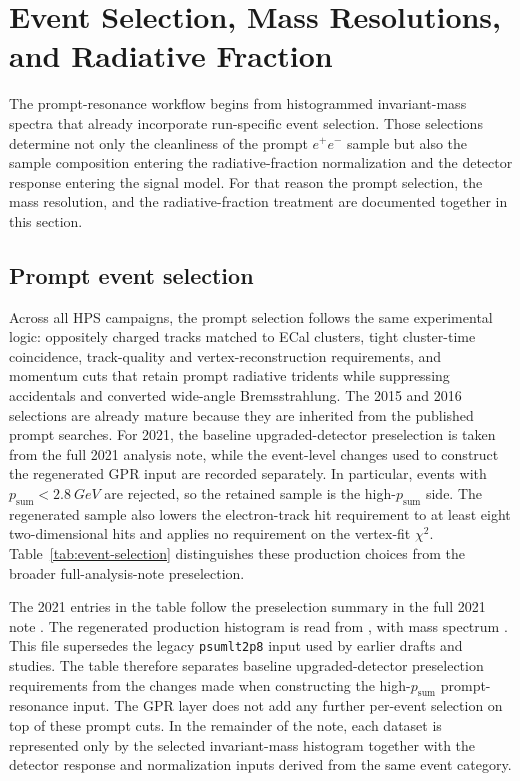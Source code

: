 \section{Event Selection, Mass Resolutions, and Radiative Fraction}
\label{sec:event-selection}

The prompt-resonance workflow begins from histogrammed invariant-mass spectra that
already incorporate run-specific event selection. Those selections determine not only
the cleanliness of the prompt $e^+e^-$ sample but also the sample composition entering
the radiative-fraction normalization and the detector response entering the signal
model. For that reason the prompt selection, the mass resolution, and the
radiative-fraction treatment are documented together in this section.

\subsection{Prompt event selection}

Across all HPS campaigns, the prompt selection follows the same experimental logic:
oppositely charged tracks matched to ECal clusters, tight cluster-time coincidence,
track-quality and vertex-reconstruction requirements, and momentum cuts that retain
prompt radiative tridents while suppressing accidentals and converted wide-angle
Bremsstrahlung. The
2015 and 2016 selections are already mature because they are inherited from the
published prompt searches. For 2021, the baseline upgraded-detector preselection is
taken from the full 2021 analysis note, while the event-level changes used to construct
the regenerated GPR input are recorded separately. In particular, events with
$p_{\mathrm{sum}}<\SI{2.8}{GeV}$ are rejected, so the retained sample is the
high-$p_{\mathrm{sum}}$ side. The regenerated sample also lowers the electron-track hit
requirement to at least eight two-dimensional hits and applies no requirement on the
vertex-fit $\chi^2$. Table~\ref{tab:event-selection} distinguishes these production
choices from the broader full-analysis-note preselection.





The 2021 entries in the table follow the preselection summary in the full 2021 note
\cite[Sec.~4.8, Table~38 and App.~A]{HPS2021FullAnalysisNote}. The regenerated production
histogram is read from , with mass spectrum
. This file supersedes the legacy \texttt{psumlt2p8}
input used by earlier drafts and studies. The table therefore separates baseline
upgraded-detector preselection requirements from the changes made when constructing the
high-$p_{\mathrm{sum}}$ prompt-resonance input.
The GPR layer does not add any further per-event selection
on top of these prompt cuts. In the remainder of the note, each dataset is represented
only by the selected invariant-mass histogram together with the detector response and
normalization inputs derived from the same event category.


